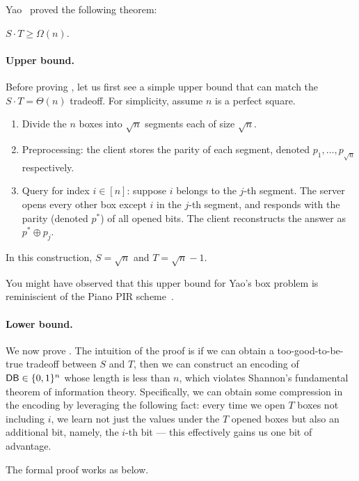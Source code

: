 Yao~\cite{yao} proved the following theorem:

\begin{theorem}
$S \cdot T \geq \Omega(n)$.   
\label{thm:yaobox}
\end{theorem} 


\paragraph{Upper bound.}
Before proving , 
let us first see a simple upper bound that can match 
the $S\cdot T = \Theta(n)$ tradeoff.
For simplicity, assume $n$ is a perfect square.
\begin{enumerate}
    \item Divide the $n$ boxes into $\sqrt{n}$ segments each
of size $\sqrt{n}$. 
    \item Preprocessing: 
the client stores the parity of each segment, denoted $p_1, \ldots, p_{\sqrt{n}}$
respectively.
    \item Query for index $i \in [n]$: 
suppose $i$ belongs 
to the $j$-th segment. 
The server opens 
every other box 
except $i$ in the $j$-th segment,  %
and responds with the parity 
(denoted $p^*$)
of all opened bits.
The client reconstructs %
the answer 
as $p^* \oplus p_j$.
\end{enumerate}
In this construction, $S = \sqrt{n}$ and $T = \sqrt{n} - 1$.

You might have observed that this upper bound for Yao's
box problem is reminiscient of the  
Piano PIR scheme~\cite{piano}.


\paragraph{Lower bound.} 
We now prove .
The intuition of the proof is 
if we can obtain a too-good-to-be-true  
tradeoff 
between $S$ and $T$, then we can construct 
an encoding of ${\sf DB} \in \{0, 1\}^n$ 
whose length is less than $n$, 
which violates 
Shannon's  
fundamental theorem of information theory.
Specifically, we can obtain some compression 
in the encoding 
by leveraging the following fact: every time 
we open $T$ boxes not including $i$, we 
learn not just the values under the $T$ opened boxes 
but also an additional 
bit, namely, the $i$-th bit --- this effectively  
gains us one bit of advantage.

The formal proof works as below.

